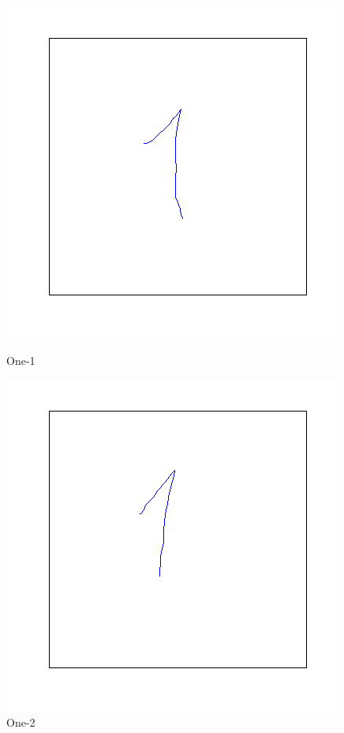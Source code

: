 \documentclass[a4paper, 10pt]{article}
\begin{document}
\begin{figure}[ht]
\begin{minipage}[b]{0.45\linewidth}
\centering
\includegraphics[width=\textwidth]{figs/1-1}
\caption{One-1}
\label{fig:figure1}
\end{minipage}
\hspace{0.5cm}
\begin{minipage}[b]{0.45\linewidth}
\centering
\includegraphics[width=\textwidth]{figs/1-2}
\caption{One-2}
\label{fig:figure2}
\end{minipage}
\end{figure}
\end{document}
